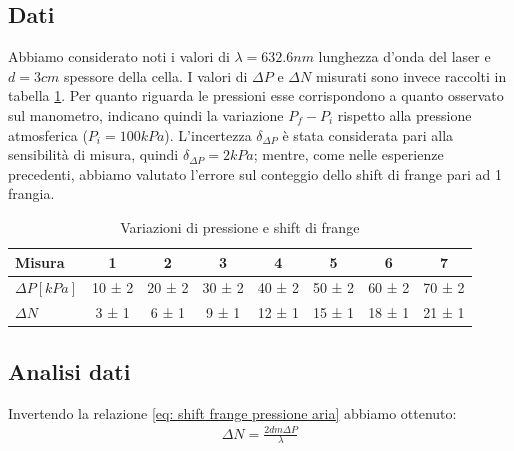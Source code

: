 \documentclass[a4paper]{article}
\begin{document}
\subsection{Dati}
Abbiamo considerato noti i valori di $\lambda=632.6 nm$ lunghezza d'onda del laser e $d=3 cm$ spessore della cella. I valori di $\Delta P$ e $\Delta N$ misurati sono invece raccolti in tabella \ref{tab: delta p e delta n}. Per quanto riguarda le pressioni esse corrispondono a quanto osservato sul manometro, indicano quindi la variazione $P_f- P_i$ rispetto alla pressione atmosferica ($P_i = 100 kPa$). L'incertezza $\delta_{\Delta P}$ è stata considerata pari alla sensibilità di misura, quindi $\delta_{\Delta P}=2 kPa$; mentre, come nelle esperienze precedenti, abbiamo valutato l'errore sul conteggio dello shift di frange pari ad 1 frangia.

\begin{table}[htbp]
\centering
\caption{Variazioni di pressione e shift di frange}
\label{tab: delta p e delta n}
\begin{tabular}{|l|ccccccc|}
\hline
Misura & 1 & 2 & 3 & 4 & 5 & 6 & 7 \\\hline\hline
$\Delta P [kPa]$ & 10 ± 2 & 20 ± 2 & 30 ± 2 & 40 ± 2 & 50 ± 2 & 60 ± 2 & 70 ± 2 \\\hline
$\Delta N$ & 3 ± 1 & 6 ± 1 & 9 ± 1 & 12 ± 1 & 15 ± 1 & 18 ± 1 & 21 ± 1 \\\hline
\end{tabular}
\end{table}

\subsection{Analisi dati}
Invertendo la relazione \ref{eq: shift frange pressione aria} abbiamo ottenuto:
\begin{align}
    \Delta N = \frac{2dm \Delta P}{\lambda}
\end{align}
\end{document}
